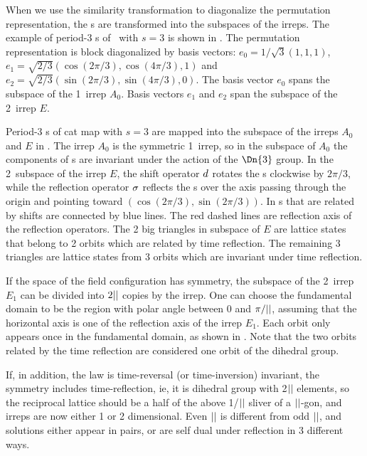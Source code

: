 When we use the similarity transformation to diagonalize the permutation
representation, the {\lattstate}s are transformed into the subspaces of
the irreps. The example of period-3 {\lattstate}s of \templatt\ with
$s=3$ is shown in . The permutation representation
is block diagonalized by basis vectors: $e_0=1/\sqrt{3}(1,1,1)$,
$e_1=\sqrt{2/3}(\cos(2\pi/3),\cos(4\pi/3),1)$ and
$e_2=\sqrt{2/3}(\sin(2\pi/3),\sin(4\pi/3),0)$. The basis vector $e_0$
spans the subspace of the 1\dmn\ irrep $A_0$. Basis vectors $e_1$ and
$e_2$ span the subspace of the 2\dmn\ irrep $E$.

Period-3 {\lattstate}s of cat map with $s=3$ are mapped into the subspace
of the irreps $A_0$ and $E$ in .
The irrep $A_0$ is the symmetric 1\dmn\ irrep, so in the subspace of $A_0$ the components
of {\lattstate}s are invariant under the action of the $\Dn{3}$ group.
In the 2\dmn\ subspace of the irrep $E$, the shift operator $d$ rotates the
{\lattstate}s clockwise by $2\pi/3$, while the reflection operator $\sigma$ reflects the {\lattstate}s
over the axis passing through the origin and pointing toward $(\cos(2\pi/3),\sin(2\pi/3))$.
In 
{\lattstate}s that are related by shifts are connected by blue lines.
The red dashed lines are reflection axis of the reflection operators.
The 2 big triangles in  subspace of $E$ are lattice states
that belong to 2 orbits which are related by time reflection. The remaining 3 triangles
are lattice states from 3 orbits which are invariant under time reflection.

If the space of the field configuration has \Dn{\cl{}} symmetry,
the subspace of the 2\dmn\ irrep $E_1$ can be divided
into $2{||}$ copies by the irrep. One can choose the fundamental domain to be the region
with polar angle between 0 and $\pi/{||}$, assuming that the horizontal axis is one of the
reflection axis of the irrep $E_1$. Each orbit only appears once in the fundamental domain,
as shown in . Note that the two orbits related by
the time reflection are considered one orbit of the dihedral group.

If, in addition, the law is time-reversal (or time-inversion) invariant,
the symmetry includes time-reflection, ie, it is dihedral group 
with 2${||}$ elements, so the reciprocal lattice should be a half of the
above 1/${||}$ sliver of a ${||}$-gon, and irreps are now either 1 or 2
dimensional. Even ${||}$ is different from odd ${||}$, and solutions either appear
in pairs, or are self dual under reflection in 3 different ways.

